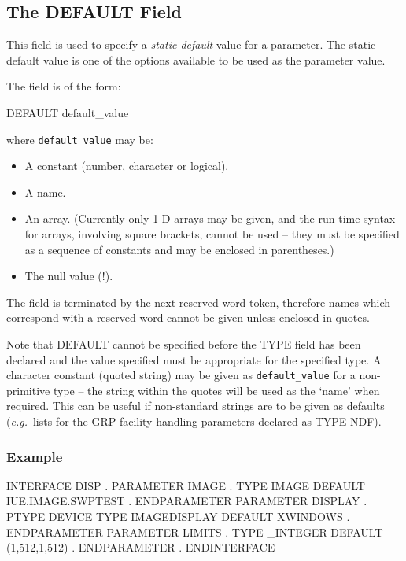 \documentclass[twoside,11pt,nolof]{starlink}
\begin{document}
\subsection{The DEFAULT Field
\label{default}}

This field is used to specify a \emph{static default} value for a parameter.
The static default value is one of the options available to be used as the
parameter value.

The field is of the form:
\begin{terminalv}
DEFAULT default_value
\end{terminalv}
where \texttt{default\_value} may be:
\begin{itemize}
\item A constant (number, character or logical).
\item A name.
\item An array. (Currently only 1-D arrays may be given, and the run-time
syntax for arrays, involving square brackets, cannot be used -- they must be
specified as a sequence of constants and may be enclosed in parentheses.)
\item The null value (!).
\end{itemize}
The field is terminated by the next reserved-word token, therefore names which
correspond with a reserved word cannot be given unless enclosed in quotes.

Note that DEFAULT cannot be specified before the TYPE field has been declared
and the value specified must be appropriate for the specified type.
A character constant (quoted string) may be given as \texttt{default\_value}
for a non-primitive type -- the string within the quotes will be used as the
`name' when required. This can be useful if non-standard strings are to be
given as defaults (\emph{e.g.}\ lists for the GRP facility handling parameters
declared as TYPE NDF).

\subsubsection*{Example}
\begin{terminalv}
INTERFACE DISP
      .
   PARAMETER IMAGE
         .
      TYPE IMAGE
      DEFAULT IUE.IMAGE.SWPTEST
         .
   ENDPARAMETER
   PARAMETER DISPLAY
         .
      PTYPE DEVICE
      TYPE IMAGEDISPLAY
      DEFAULT XWINDOWS
         .
   ENDPARAMETER
   PARAMETER LIMITS
         .
      TYPE _INTEGER
      DEFAULT (1,512,1,512)
         .
   ENDPARAMETER
      .
ENDINTERFACE
\end{terminalv}
\end{document}
